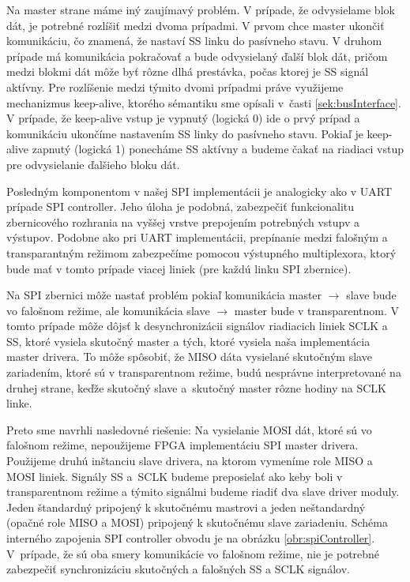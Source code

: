 Na master strane máme iný zaujímavý problém. V prípade, že odvysielame blok dát, je potrebné rozlíšiť medzi dvoma prípadmi. V prvom chce master ukončiť komunikáciu, čo znamená, že nastaví SS linku do pasívneho stavu. V druhom prípade má komunikácia pokračovať a bude odvysielaný ďalší blok dát, pričom medzi blokmi dát môže byť rôzne dlhá prestávka, počas ktorej je SS signál aktívny. Pre rozlíšenie medzi týmito dvomi prípadmi práve využijeme mechanizmus keep-alive, ktorého sémantiku sme opísali v~časti \ref{sek:busInterface}. V prípade, že keep-alive vstup je vypnutý (logická 0) ide o prvý prípad a komunikáciu ukončíme nastavením SS linky do pasívneho stavu. Pokiaľ je  keep-alive zapnutý (logická 1) ponecháme SS aktívny a budeme čakať na riadiaci vstup pre odvysielanie ďalšieho bloku dát.

Posledným komponentom v našej SPI implementácii je analogicky ako v UART prípade SPI controller. Jeho úloha je podobná, zabezpečiť funkcionalitu zbernicového rozhrania na vyššej vrstve prepojením potrebných vstupv a výstupov. Podobne ako pri UART implementácii, prepínanie medzi falošným a transparantným režimom zabezpečíme pomocou výstupného multiplexora, ktorý bude mať v tomto prípade viacej liniek (pre každú linku SPI zbernice).

Na SPI zbernici môže nastať problém pokiaľ komunikácia master $\to$ slave bude vo falošnom režime, ale komunikácia slave $\to$ master bude v transparentnom. V tomto prípade môže dôjsť k desynchronizácii signálov riadiacich liniek SCLK a SS, ktoré vysiela skutočný master a tých, ktoré vysiela naša implementácia master drivera. To môže spôsobiť, že MISO dáta vysielané skutočným slave zariadením, ktoré sú v transparentnom režime, budú nesprávne interpretované na druhej strane, keďže skutočný slave a~skutočný master  rôzne hodiny na SCLK linke.

Preto sme navrhli nasledovné riešenie: Na vysielanie MOSI dát, ktoré sú vo falošnom režime, nepoužijeme FPGA implementáciu SPI master drivera. Použijeme druhú inštanciu slave drivera, na ktorom vymeníme role MISO a MOSI liniek. Signály SS a~SCLK budeme preposielať ako keby boli v transparentnom režime a týmito signálmi budeme riadiť dva slave driver moduly. Jeden štandardný pripojený k skutočnému mastrovi a jeden neštandardný (opačné role MISO a MOSI) pripojený k skutočnému slave zariadeniu. Schéma interného zapojenia SPI controller obvodu je na obrázku \ref{obr:spiController}. V~prípade, že sú oba smery komunikácie vo falošnom režime, nie je potrebné zabezpečiť synchronizáciu skutočných a falošných SS a SCLK signálov.

